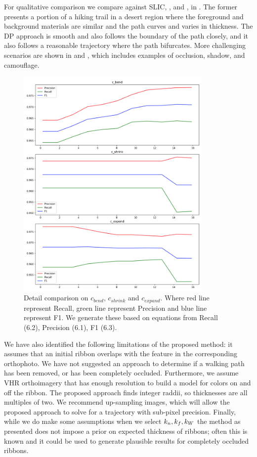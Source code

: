 For qualitative comparison we compare against \ac{SLIC}, \ActiveContours{}, and \GrabCut{}, in
. The former presents a portion of a hiking trail in a desert region where the foreground and background materials are similar and the path curves and varies in thickness. The \ac{DP} approach is smooth and also follows the boundary of the path closely, and it also follows a reasonable trajectory where the path bifurcates. More challenging scenarios are shown in  and , which includes examples of occlusion, shadow, and camouflage.  

\begin{figure}[H]
    \centering
    \includegraphics[width=0.85\textwidth]{Figures/prf.png}
    \caption[Parameters Evaluation]{Detail comparison on $c_{bend}$, $c_{shrink}$ and $c_{expand}$. Where red line represent Recall, green line represent Precision and blue line represent F1. We generate these based on equations from Recall (6.2), Precision (6.1), F1 (6.3).}
    \label{fig:change_on_recall}
\end{figure}

We have also identified the following limitations of the proposed method: it assumes that an initial ribbon overlaps with the feature in the corresponding orthophoto. 
We have not suggested an approach to determine if a walking path has been removed, or has been completely occluded. Furthermore, we assume \ac{VHR} orthoimagery that has enough resolution to build a model for colors on and off the ribbon. 
The proposed approach finds integer raddii, so thicknesses are all multiples of two. 
We recommend up-sampling images, which will allow the proposed approach to solve for a trajectory with sub-pixel precision. 
Finally, while we do make some assumptions when we select $k_n{}, k_f{}, k_W{}$ the method as presented does not impose a prior on expected thickness of ribbons; often this is known and it could be used to generate plausible results for completely occluded ribbons.


